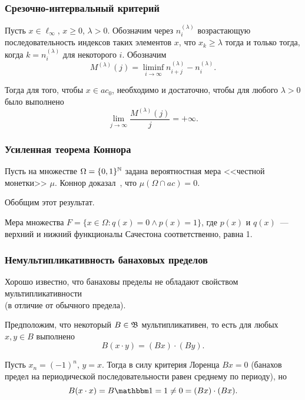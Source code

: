 \begin{frame}\frametitle{Срезочно-интервальный критерий}
	\begin{ttheorem}
		Пусть $x\in\ell_\infty$, $x \geq 0$, $\lambda>0$.
		Обозначим через $n^{(\lambda)}_i$ возрастающую последовательность
		индексов таких элементов $x$, что $x_k \geq \lambda$ тогда и только тогда,
		когда $k=n^{(\lambda)}_i$ для некоторого $i$.
		Обозначим
		\begin{equation}
			M^{(\lambda)}(j) = \liminf_{i\to\infty} n^{(\lambda)}_{i+j} - n^{(\lambda)}_i
			.
		\end{equation}


		Тогда для того, чтобы $x\in ac_0$, необходимо и достаточно, чтобы
		для любого $\lambda>0$ было выполнено
		\begin{equation}
			\lim_{j \to \infty} \frac{M^{(\lambda)}(j)}{j} = +\infty
			.
		\end{equation}
	\end{ttheorem}
\end{frame}


\begin{frame}\frametitle{Усиленная теорема Коннора}
	Пусть на множестве $\Omega=\{0,1\}^{\mathbb{N}}$ задана вероятностная мера <<честной монетки>> $\mu$.
	Коннор доказал~\cite{connor1990almost}, что $\mu(\Omega\cap ac)=0$.

	Обобщим этот результат.

	\begin{ttheorem}
	Мера множества $F=\{x\in\Omega : q(x) = 0 \wedge p(x)= 1\}$,
	где $p(x)$ и $q(x)$~--- верхний и нижний функционалы Сачестона соответственно,
	равна 1.
	\end{ttheorem}
\end{frame}


\begin{frame}\frametitle{Немультипликативность банаховых пределов}
	Хорошо известно,
	что банаховы пределы не обладают свойством мультипликативности
	\\
	(в отличие от обычного предела).

	Предположим, что некоторый $B\in \mathfrak{B}$ мультипликативен,
	то есть для любых $x,y\in B$ выполнено
	\begin{equation}
		B(x\cdot y) = (Bx)\cdot (By)
		.
	\end{equation}

	Пусть $x_n = (-1)^n$, $y=x$.
	Тогда в силу критерия Лоренца $Bx = 0$
	(банахов предел на периодической последовательности равен среднему по периоду),
	но
	\begin{equation}
		B(x\cdot x) = B\one = 1 \ne 0 = (Bx) \cdot (Bx)
		.
	\end{equation}


\end{frame}


